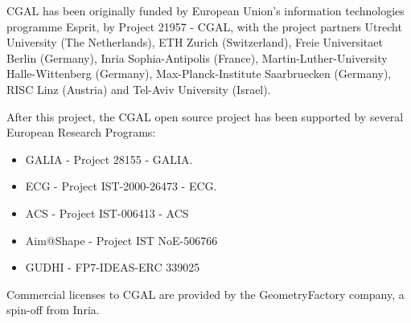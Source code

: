 %
%



CGAL has been originally funded by European Union's information technologies programme Esprit, by Project 21957 - CGAL, with the project partners Utrecht University (The Netherlands), ETH Zurich (Switzerland), Freie Universitaet Berlin (Germany), Inria Sophia-Antipolis (France), Martin-Luther-University Halle-Wittenberg (Germany), Max-Planck-Institute Saarbruecken (Germany), RISC Linz (Austria) and Tel-Aviv University (Israel).

After this project, the CGAL open source project has been supported by several European Research Programs:
\begin{itemize}
\item GALIA - Project 28155 - GALIA.
\item ECG -  Project IST-2000-26473 - ECG.
\item ACS - Project IST-006413 - ACS
\item Aim@Shape - Project IST NoE-506766
\item GUDHI - FP7-IDEAS-ERC 339025
\end{itemize}

Commercial licenses to CGAL are provided by the GeometryFactory company, a spin-off from Inria.


